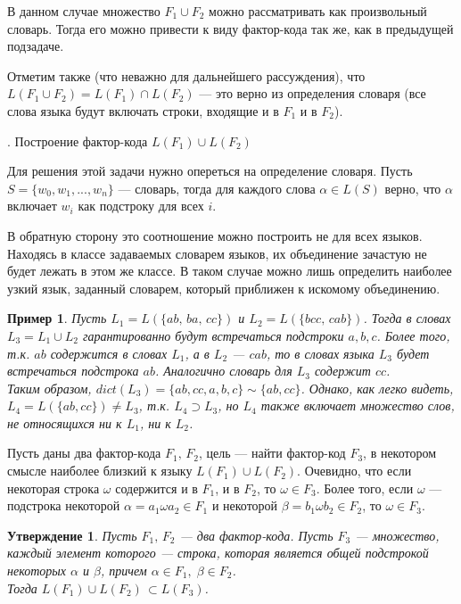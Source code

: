 \documentclass[14pt, russian]{scrartcl}
\newcounter{cExample}
\newcounter{cStatement}
\newtheorem{Example}{Пример}[cExample]
\newtheorem{Statement}{Утверждение}[cStatement]
\begin{document}
В данном случае множество $F_1\cup F_2$ можно рассматривать как произвольный словарь. Тогда его можно привести к виду фактор-кода так же, как в предыдущей подзадаче.

Отметим также (что неважно для дальнейшего рассуждения), что $L(F_1 \cup F_2) = L(F_1) \cap L(F_2)$ --- это верно из определения словаря (все слова языка будут включать строки, входящие и в $F_1$ и в $F_2$).


\vspace{10pt}
{. Построение фактор-кода $L(F_1) \cup L(F_2)$

}

\vspace{4pt}

Для решения этой задачи нужно опереться на определение словаря. Пусть $S = \{w_0, w_1, ..., w_n\}$ --- словарь, тогда для каждого слова $\alpha \in L(S)$ верно, что $\alpha$ включает $w_i$ как подстроку для всех $i$.

В обратную сторону это соотношение можно построить не для всех языков. Находясь в классе задаваемых словарем языков, их объединение зачастую не будет лежать в этом же классе. В таком случае можно лишь определить наиболее узкий язык, заданный словарем, который приближен к искомому объединению.

\begin{Example}
    Пусть $L_1 = L(\{ab,\, ba,\, cc\})$ и  $L_2 = L(\{bcc,\, cab\})$.
    Тогда в словах $L_3 = L_1 \cup L_2$ гарантированно будут встречаться подстроки $a, b, c$. Более того, т.к. $ab$ содержится в словах $L_1$, а в $L_2$ --- $cab$, то в словах языка $L_3$ будет встречаться подстрока $ab$. Аналогично словарь для $L_3$ содержит $cc$. \\
    Таким образом, $dict(L_3) = \{ab, cc, a, b, c\} \sim \{ab, cc\}$. Однако, как легко видеть, $L_4 =L(\{ab, cc\}) \neq L_3$, т.к. $L_4 \supset L_3$, но $L_4$ также включает множество слов, не относящихся ни к $L_1$, ни к $L_2$.   
\end{Example}

Пусть даны два фактор-кода $F_1, \, F_2$, цель --- найти фактор-код $F_3$, в некотором смысле наиболее близкий к языку $L(F_1) \cup L(F_2)$.
Очевидно, что если некоторая строка $\omega$ содержится и в $F_1$, и в $F_2$, то $\omega \in F_3$. Более того, если $\omega$ --- подстрока некоторой $\alpha = a_1\omega a_2 \in F_1 $ и некоторой $\beta = b_1 \omega b_2 \in F_2$, то $\omega \in F_3$.

\begin{Statement}
    Пусть $F_1, \, F_2$ --- два фактор-кода. Пусть $F_3$ --- множество, каждый элемент которого --- строка, которая является общей подстрокой некоторых $\alpha$ и $\beta$, причем $\alpha \in F_1 ,\; \beta \in F_2$. 
    \\
    Тогда $L(F_1) \cup L(F_2) \, \subset L(F_3)$.
\end{Statement}
\end{document}
